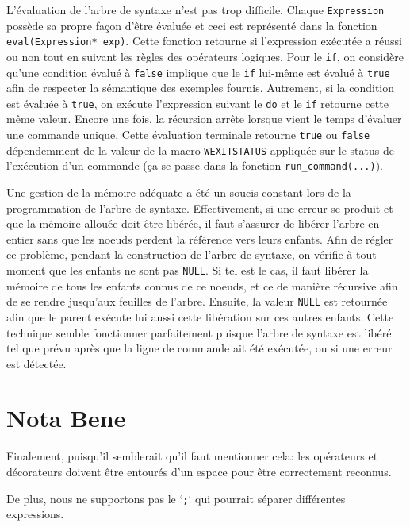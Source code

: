 \documentclass{article}
\begin{document}
L'évaluation de l'arbre de syntaxe n'est pas trop difficile. Chaque \texttt{Expression} possède sa propre façon d'être évaluée et ceci est représenté dans la fonction \texttt{eval(Expression* exp)}. Cette fonction retourne si l'expression exécutée a réussi ou non tout en suivant les règles des opérateurs logiques. Pour le \texttt{if}, on considère qu'une condition évalué à \texttt{false} implique que le \texttt{if} lui-même est évalué à \texttt{true} afin de respecter la sémantique des exemples fournis. Autrement, si la condition est évaluée à \texttt{true}, on exécute l'expression suivant le \texttt{do} et le \texttt{if} retourne cette même valeur. Encore une fois, la récursion arrête lorsque vient le temps d'évaluer une commande unique. Cette évaluation terminale retourne \texttt{true} ou \texttt{false} dépendemment de la valeur de la macro \texttt{WEXITSTATUS} appliquée sur le status de l'exécution d'un commande (ça se passe dans la fonction \texttt{run\_command(...)}).\newline

Une gestion de la mémoire adéquate a été un soucis constant lors de la programmation de l'arbre de syntaxe. Effectivement, si une erreur se produit et que la mémoire allouée doit être libérée, il faut s'assurer de libérer l'arbre en entier sans que les noeuds perdent la référence vers leurs enfants. Afin de régler ce problème, pendant la construction de l'arbre de syntaxe, on vérifie à tout moment que les enfants ne sont pas \texttt{NULL}. Si tel est le cas, il faut libérer la mémoire de tous les enfants connus de ce noeuds, et ce de manière récursive afin de se rendre jusqu'aux feuilles de l'arbre. Ensuite, la valeur \texttt{NULL} est retournée afin que le parent exécute lui aussi cette libération sur ces autres enfants. Cette technique semble fonctionner parfaitement puisque l'arbre de syntaxe est libéré tel que prévu après que la ligne de commande ait été exécutée, ou si une erreur est détectée.\newline

\section{Nota Bene}

Finalement, puisqu'il semblerait qu'il faut mentionner cela: les opérateurs et décorateurs doivent être entourés d'un espace pour être correctement reconnus.

De plus, nous ne supportons pas le `\texttt{;}` qui pourrait séparer différentes expressions.
\end{document}

